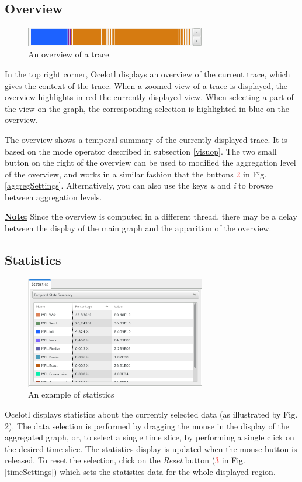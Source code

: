 \documentclass[twoside]{article}
\begin{document}
\begin{sloppypar}
\subsection{Overview}
\begin{figure}[h!]
	\centering
	\includegraphics[width=0.7\textwidth]{images/overview.png}
	\caption{An overview of a trace}
	\label{overview}
\end{figure}
In the top right corner, Ocelotl displays an overview of the current trace, which gives the context of the trace. When a zoomed view of a trace is displayed, the overview highlights in red the currently displayed view. When selecting a part of the view on the graph, the corresponding selection is highlighted in blue on the overview.

The overview shows a temporal summary of the currently displayed trace. It is based on the mode operator described in subsection \ref{visuop}. The two small button on the right of the overview can be used to modified the aggregation level of the overview, and works in a similar fashion that the buttons \textcolor{red}{2} in Fig. \ref{aggregSettings}. Alternatively, you can also use the keys \textit{u} and \textit{i} to browse between aggregation levels.

\underline{\textbf{Note:}} Since the overview is computed in a different thread, there may be a delay between the display of the main graph and the apparition of the overview.

\subsection{Statistics}
\begin{figure}[h!]
	\centering
	\includegraphics[width=0.7\textwidth]{images/statistics.png}
	\caption{An example of statistics}
	\label{stats}
\end{figure}
Ocelotl displays statistics about the currently selected data (as illustrated by Fig. \ref{stats}). The data selection is performed by dragging the mouse in the display of the aggregated graph, or, to select a single time slice, by performing a single click on the desired time slice. The statistics display is updated when the mouse button is released. To reset the selection, click on the \textit{Reset} button (\textcolor{red}{3} in Fig. \ref{timeSettings}) which sets the statistics data for the whole displayed region. 


\end{sloppypar}
\end{document}
